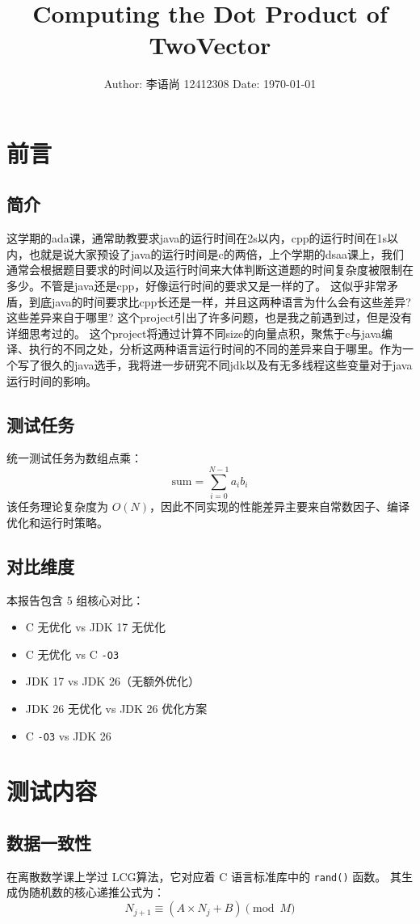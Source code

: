 \documentclass[UTF8]{ctexart}
\title{\textbf{Computing the Dot Product of TwoVector}}
\author{
    Author: 李语尚 12412308
    \newline
    Date: \today
}
\date{}
\begin{document}
\maketitle
\tableofcontents
\newpage

\section{前言}
\subsection{简介}
这学期的ada课，通常助教要求java的运行时间在2s以内，cpp的运行时间在1s以内，也就是说大家预设了java的运行时间是c的两倍，上个学期的dsaa课上，我们通常会根据题目要求的时间以及运行时间来大体判断这道题的时间复杂度被限制在多少。不管是java还是cpp，好像运行时间的要求又是一样的了。
这似乎非常矛盾，到底java的时间要求比cpp长还是一样，并且这两种语言为什么会有这些差异?这些差异来自于哪里?
这个project引出了许多问题，也是我之前遇到过，但是没有详细思考过的。
这个project将通过计算不同size的向量点积，聚焦于c与java编译、执行的不同之处，分析这两种语言运行时间的不同的差异来自于哪里。作为一个写了很久的java选手，我将进一步研究不同jdk以及有无多线程这些变量对于java运行时间的影响。
\subsection{测试任务}
统一测试任务为数组点乘：
\[
\text{sum} = \sum_{i=0}^{N-1} a_i b_i
\]
该任务理论复杂度为 $O(N)$，因此不同实现的性能差异主要来自常数因子、编译优化和运行时策略。

\subsection{对比维度}
本报告包含 5 组核心对比：
\begin{itemize}
    \item C 无优化 vs JDK 17 无优化
    \item C 无优化 vs C \texttt{-O3}
    \item JDK 17 vs JDK 26（无额外优化）
    \item JDK 26 无优化 vs JDK 26 优化方案
    \item C \texttt{-O3} vs JDK 26
\end{itemize}
\section{测试内容}
\subsection{数据一致性}
在离散数学课上学过 LCG算法，它对应着 C 语言标准库中的 \texttt{rand()} 函数。
其生成伪随机数的核心递推公式为：
\[
N_{j+1} \equiv (A \times N_{j} + B) \pmod{M}
\]
\end{document}
